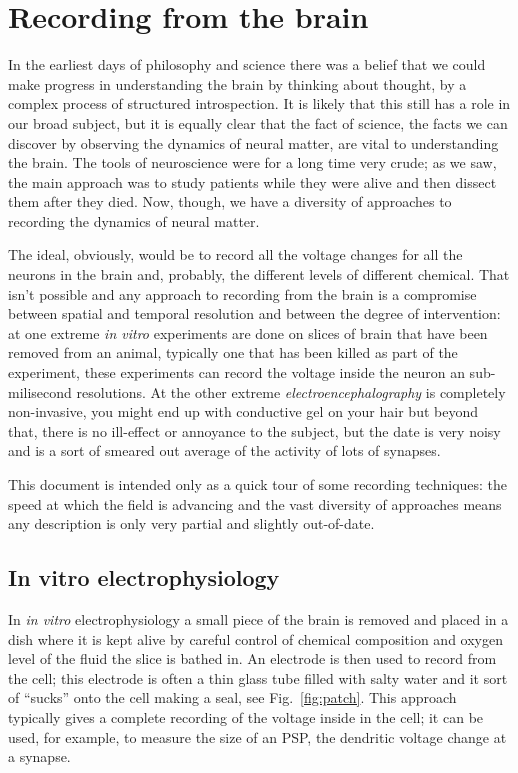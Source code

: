 \documentclass[12pt]{article}
\begin{document}
\section*{Recording from the brain}

In the earliest days of philosophy and science there was a belief that
we could make progress in understanding the brain by thinking about
thought, by a complex process of structured introspection. It is
likely that this still has a role in our broad subject, but it is
equally clear that the fact of science, the facts we can discover by
observing the dynamics of neural matter, are vital to understanding
the brain. The tools of neuroscience were for a long time very crude;
as we saw, the main approach was to study patients while they were
alive and then dissect them after they died. Now, though, we have a
diversity of approaches to recording the dynamics of neural matter.

The ideal, obviously, would be to record all the voltage changes for
all the neurons in the brain and, probably, the different levels of
different chemical. That isn't possible and any approach to recording
from the brain is a compromise between spatial and temporal resolution
and between the degree of intervention: at one extreme \textsl{in
  vitro} experiments are done on slices of brain that have been
removed from an animal, typically one that has been killed as part of
the experiment, these experiments can record the voltage inside the
neuron an sub-milisecond resolutions. At the other extreme
\textsl{electroencephalography} is completely non-invasive, you might
end up with conductive gel on your hair but beyond that, there is no
ill-effect or annoyance to the subject, but the date is very noisy and
is a sort of smeared out average of the activity of lots of synapses.

This document is intended only as a quick tour of some recording
techniques: the speed at which the field is advancing and the vast
diversity of approaches means any description is only very partial and
slightly out-of-date.

\subsection*{In vitro electrophysiology}

In \textsl{in vitro} electrophysiology a small piece of the brain is
removed and placed in a dish where it is kept alive by careful control
of chemical composition and oxygen level of the fluid the slice is
bathed in. An electrode is then used to record from the cell; this
electrode is often a thin glass tube filled with salty water and it
sort of ``sucks'' onto the cell making a seal, see
Fig.~\ref{fig:patch}. This approach typically gives a complete
recording of the voltage inside in the cell; it can be used, for
example, to measure the size of an PSP, the dendritic voltage change
at a synapse.
\end{document}
